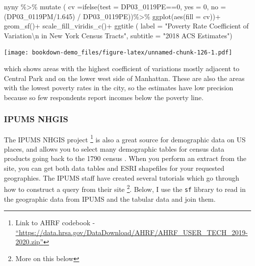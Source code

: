 \documentclass[
]{article}
\newenvironment{Shaded}{\begin{snugshade}}{\end{snugshade}}
\newcommand{\AttributeTok}[1]{\textcolor[rgb]{0.77,0.63,0.00}{#1}}
\newcommand{\DecValTok}[1]{\textcolor[rgb]{0.00,0.00,0.81}{#1}}
\newcommand{\FloatTok}[1]{\textcolor[rgb]{0.00,0.00,0.81}{#1}}
\newcommand{\FunctionTok}[1]{\textcolor[rgb]{0.00,0.00,0.00}{#1}}
\newcommand{\NormalTok}[1]{#1}
\newcommand{\SpecialCharTok}[1]{\textcolor[rgb]{0.00,0.00,0.00}{#1}}
\newcommand{\StringTok}[1]{\textcolor[rgb]{0.31,0.60,0.02}{#1}}
\begin{document}
\begin{Shaded}
\begin{Highlighting}[]
\NormalTok{nyny }\SpecialCharTok{\%\textgreater{}\%} 
  \FunctionTok{mutate}\NormalTok{ ( }\AttributeTok{cv =}\FunctionTok{ifelse}\NormalTok{(}\AttributeTok{test =}\NormalTok{ DP03\_0119PE}\SpecialCharTok{==}\DecValTok{0}\NormalTok{,}
                      \AttributeTok{yes =} \DecValTok{0}\NormalTok{,}
                      \AttributeTok{no =}\NormalTok{ (DP03\_0119PM}\SpecialCharTok{/}\FloatTok{1.645}\NormalTok{) }\SpecialCharTok{/}\NormalTok{ DP03\_0119PE))}\SpecialCharTok{\%\textgreater{}\%}
  \FunctionTok{ggplot}\NormalTok{(}\FunctionTok{aes}\NormalTok{(}\AttributeTok{fill =}\NormalTok{ cv))}\SpecialCharTok{+}
  \FunctionTok{geom\_sf}\NormalTok{()}\SpecialCharTok{+}
  \FunctionTok{scale\_fill\_viridis\_c}\NormalTok{()}\SpecialCharTok{+}
  \FunctionTok{ggtitle}\NormalTok{ ( }\AttributeTok{label =} \StringTok{"Poverty Rate Coefficient of Variation}\SpecialCharTok{\textbackslash{}n}\StringTok{ in New York Census Tracts"}\NormalTok{, }
            \AttributeTok{subtitle =} \StringTok{"2018 ACS Estimates"}\NormalTok{)}
\end{Highlighting}
\end{Shaded}

\texttt{[image: bookdown-demo\_files/figure-latex/unnamed-chunk-126-1.pdf]}

which shows areas with the highest coefficient of variations mostly adjacent to Central Park and on the lower west side of Manhattan. These are also the areas with the lowest poverty rates in the city, so the estimates have low precision because so few respondents report incomes below the poverty line.

\hypertarget{ipums-nhgis}{%
\subsubsection{IPUMS NHGIS}\label{ipums-nhgis}}

The IPUMS NHGIS project \footnote{Link to AHRF codebook - \href{https://data.hrsa.gov/DataDownload/AHRF/AHRF_USER_TECH_2019-2020.zip}{``https://data.hrsa.gov/DataDownload/AHRF/AHRF\_USER\_TECH\_2019-2020.zip''}} is also a great source for demographic data on US places, and allows you to select many demographic tables for census data products going back to the 1790 census \citep{nhgis}. When you perform an extract from the site, you can get both data tables and ESRI shapefiles for your requested geographies. The IPUMS staff have created several tutorials which go through how to construct a query from their site \footnote{More on this below}. Below, I use the \texttt{sf} library to read in the geographic data from IPUMS and the tabular data and join them.
\end{document}
